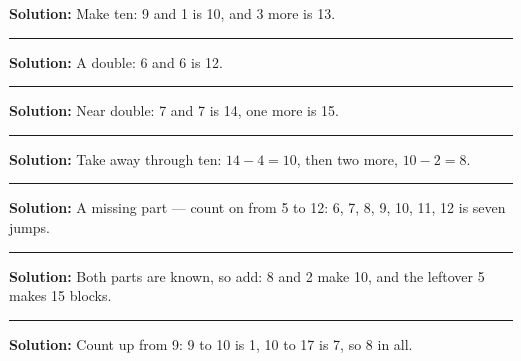 \documentclass[12pt]{article}
\begin{document}



\textbf{Solution:} Make ten: 9 and 1 is 10, and 3 more is 13. 

\vspace{0.2cm}\noindent\rule{\linewidth}{0.2pt}\vspace{0.1cm}


\textbf{Solution:} A double: 6 and 6 is 12. 

\vspace{0.2cm}\noindent\rule{\linewidth}{0.2pt}\vspace{0.1cm}


\textbf{Solution:} Near double: 7 and 7 is 14, one more is 15. 

\vspace{0.2cm}\noindent\rule{\linewidth}{0.2pt}\vspace{0.1cm}


\textbf{Solution:} Take away through ten: $14 - 4 = 10$, then two more,
$10 - 2 = 8$. 

\vspace{0.2cm}\noindent\rule{\linewidth}{0.2pt}\vspace{0.1cm}


\textbf{Solution:} A missing part --- count on from 5 to 12: 6, 7, 8, 9, 10,
11, 12 is seven jumps. 

\vspace{0.2cm}\noindent\rule{\linewidth}{0.2pt}\vspace{0.1cm}


\textbf{Solution:} Both parts are known, so add: 8 and 2 make 10, and the
leftover 5 makes 15 blocks. 

\vspace{0.2cm}\noindent\rule{\linewidth}{0.2pt}\vspace{0.1cm}


\textbf{Solution:} Count up from 9: 9 to 10 is 1, 10 to 17 is 7, so 8 in all.
\end{document}
